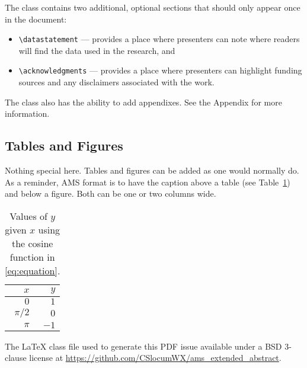 \documentclass[9pt]{ametsocextabs}
\begin{document}
The class contains two additional, optional sections that should
only appear once in the document:
\begin{itemize}
    \item \texttt{\textbackslash datastatement} ---
        provides a place where presenters can note where readers will
        find the data used in the research, and
    \item \texttt{\textbackslash acknowledgments} ---
        provides a place where presenters can highlight funding sources
        and any disclaimers associated with the work.
\end{itemize}

The class also has the ability to add appendixes. See the Appendix
for more information.

\subsection{Tables and Figures}
Nothing special here. Tables and figures can be added as one would
normally do. As a reminder, AMS format is to have the caption above
a table (see Table~\ref{tab:cos}) and below a figure. Both can be one
or two columns wide.

\begin{table}
    \caption{Values of $y$ given $x$ using the cosine function in \eqref{eq:equation}.}\label{tab:cos}
    \begin{center}
        \begin{tabular}{rr}
            \hline\hline
            $x$ & $y$\\
            \hline
            $0$ & $1$ \\
            $\pi/2$ & $0$ \\
            $\pi$ & $-1$ \\
            \hline
        \end{tabular}
    \end{center}
\end{table}


%
\datastatement The LaTeX class file used to generate this PDF issue
available under a BSD 3-clause license at
\url{https://github.com/CSlocumWX/ams_extended_abstract}.
\end{document}
